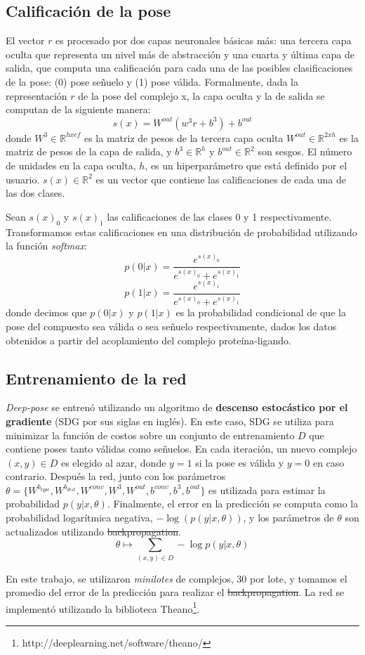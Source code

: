 \subsection{Calificación de la pose}
El vector $r$ es procesado por dos capas neuronales básicas más: una
tercera capa oculta que representa un nivel más de abstracción y una
cuarta y última capa de salida, que computa una calificación para cada
una de las posibles clasificaciones de la pose: (0) pose señuelo y (1)
pose válida. Formalmente, dada la representación $r$ de la pose del
complejo x, la capa oculta y la de salida se computan de la siguiente
manera:
\begin{equation}
  s(x) = W^{out}(w^3r + b^3) + b^{out}
\end{equation}
donde $W^3 \in \mathbb{R}^{hxcf}$ es la matriz de pesos de la tercera
capa oculta $W^{out} \in \mathbb{R}^{2xh}$ es la matriz de pesos de la
capa de salida, y $b^3 \in \mathbb{R}^h$ y $b^{out} \in \mathbb{R}^2$ son
sesgos. El número de unidades en la capa oculta, $h$, es un hiperparámetro
que está definido por el usuario. $s(x) \in \mathbb{R}^2$ es un vector
que contiene las calificaciones de cada una de las dos clases.

Sean $s(x)_0$ y $s(x)_1$ las calificaciones de las clases 0 y 1
respectivamente. Transformamos estas calificaciones en una
distribución de probabilidad utilizando la función \textit{softmax}:
\begin{equation}
  p(0|x) = \frac{e^{s(x)_0}}{e^{s(x)_0}+e^{s(x)_1}}
\end{equation}
\begin{equation}
  p(1|x) = \frac{e^{s(x)_1}}{e^{s(x)_0}+e^{s(x)_1}}
\end{equation}
donde decimos que $p(0|x)$ y $p(1|x)$ es la probabilidad condicional
de que la pose del compuesto sea válida o sea señuelo respectivamente,
dados los datos obtenidos a partir del acoplamiento del complejo
proteína-ligando.

\subsection{Entrenamiento de la red}
\textit{Deep-pose} se entrenó utilizando un algoritmo de
\textbf{descenso estocástico por el gradiente} (SDG por sus siglas en
inglés). En este caso, SDG se utiliza para minimizar la función de
costos sobre un conjunto de entrenamiento $D$ que contiene poses tanto
válidas como señuelos. En cada iteración, un nuevo complejo $(x,y) \in D$
es elegido al azar, donde $y=1$ si la pose es válida y $y=0$ en caso
contrario. Después la red, junto con los parámetros
$\theta = \{W^{b_{type}}, W^{b_{dist}}, W^{conv}, W^3, W^{out}, b^{conv}, b^{3}, b^{out}\}$
es utilizada para estimar la probabilidad $p(y|x, \theta)$. Finalmente,
el error en la predicción se computa como la probabilidad logarítmica
negativa, $-\log(p(y|x, \theta))$, y los parámetros de $\theta$ son
actualizados utilizando \sout{backpropagation}.
\begin{equation}
  \theta \longmapsto \sum_{(x,y) \in D} -\log p(y|x, \theta)
\end{equation}

En este trabajo, se utilizaron \textit{minilotes} de complejos, 30 por
lote, y tomamos el promedio del error de la predicción para realizar
el \sout{backpropagation}. La red se implementó utilizando la biblioteca
Theano\footnote{http://deeplearning.net/software/theano/}.
